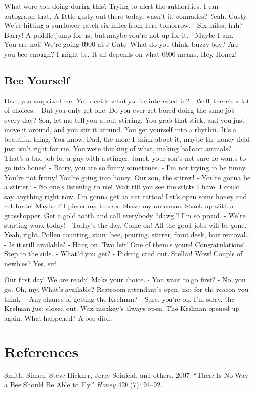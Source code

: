 \documentclass[
  letterpaper,
  twocolumn]{article}
\begin{document}
What were you doing during this? Trying to alert the authorities. I can
autograph that. A little gusty out there today, wasn't it, comrades?
Yeah. Gusty. We're hitting a sunflower patch six miles from here
tomorrow. - Six miles, huh? - Barry! A puddle jump for us, but maybe
you're not up for it. - Maybe I am. - You are not! We're going 0900 at
J-Gate. What do you think, buzzy-boy? Are you bee enough? I might be. It
all depends on what 0900 means. Hey, Honex!

\hypertarget{bee-yourself}{%
\subsection{Bee Yourself}\label{bee-yourself}}

Dad, you surprised me. You decide what you're interested in? - Well,
there's a lot of choices. - But you only get one. Do you ever get bored
doing the same job every day? Son, let me tell you about stirring. You
grab that stick, and you just move it around, and you stir it around.
You get yourself into a rhythm. It's a beautiful thing. You know, Dad,
the more I think about it, maybe the honey field just isn't right for
me. You were thinking of what, making balloon animals? That's a bad job
for a guy with a stinger. Janet, your son's not sure he wants to go into
honey! - Barry, you are so funny sometimes. - I'm not trying to be
funny. You're not funny! You're going into honey. Our son, the stirrer!
- You're gonna be a stirrer? - No one's listening to me! Wait till you
see the sticks I have. I could say anything right now. I'm gonna get an
ant tattoo! Let's open some honey and celebrate! Maybe I'll pierce my
thorax. Shave my antennae. Shack up with a grasshopper. Get a gold tooth
and call everybody ``dawg''! I'm so proud. - We're starting work today!
- Today's the day. Come on! All the good jobs will be gone. Yeah, right.
Pollen counting, stunt bee, pouring, stirrer, front desk, hair
removal\ldots{} - Is it still available? - Hang on. Two left! One of
them's yours! Congratulations! Step to the side. - What'd you get? -
Picking crud out. Stellar! Wow! Couple of newbies? Yes, sir!

Our first day! We are ready! Make your choice. - You want to go first? -
No, you go. Oh, my. What's available? Restroom attendant's open, not for
the reason you think. - Any chance of getting the Krelman? - Sure,
you're on. I'm sorry, the Krelman just closed out. Wax monkey's always
open. The Krelman opened up again. What happened? A bee died.

\hypertarget{references}{%
\section*{References}\label{references}}

\hypertarget{refs}{}
\leavevmode\hypertarget{ref-beeMovieId}{}%
Smith, Simon, Steve Hickner, Jerry Seinfeld, and others. 2007. ``There
Is No Way a Bee Should Be Able to Fly.'' \emph{Honey} 420 (7): 91--92.
\end{document}
